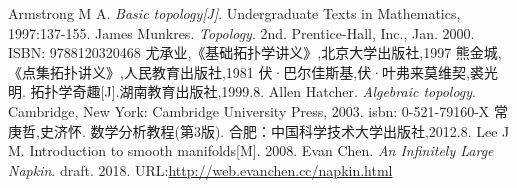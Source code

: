 \documentclass[11pt,A4paper,oneside]{amsart}
\numberwithin{equation}{section}
\theoremstyle{plain}
\theoremstyle{plain}
\numberwithin{equation}{section}
\theoremstyle{remark}
\begin{document}
\begin{thebibliography}{99}


Armstrong M A. \emph{Basic topology[J]}. Undergraduate Texts in Mathematics, 1997:137-155.
James Munkres. \emph{Topology}. 2nd. Prentice-Hall, Inc., Jan. 2000. ISBN: 9788120320468
%
尤承业,《基础拓扑学讲义》,北京大学出版社,1997
%
熊金城,《点集拓扑讲义》,人民教育出版社,1981
%
伏·巴尔佳斯基,伏·叶弗来莫维契,裘光明. 拓扑学奇趣[J].湖南教育出版社,1999.8.
%
Allen Hatcher. \emph{Algebraic topology}. Cambridge, New York: Cambridge University Press, 2003. isbn: 0-521-79160-X
%
常庚哲,史济怀. 数学分析教程(第3版). 合肥：中国科学技术大学出版社,2012.8.
%
Lee J M. Introduction to smooth manifolds[M]. 2008.
Evan Chen. \emph{An Infinitely Large Napkin}. draft. 2018.
URL:\href{http://web.evanchen.cc/napkin.html}{http://web.evanchen.cc/napkin.html}




\end{thebibliography}
\end{document}
